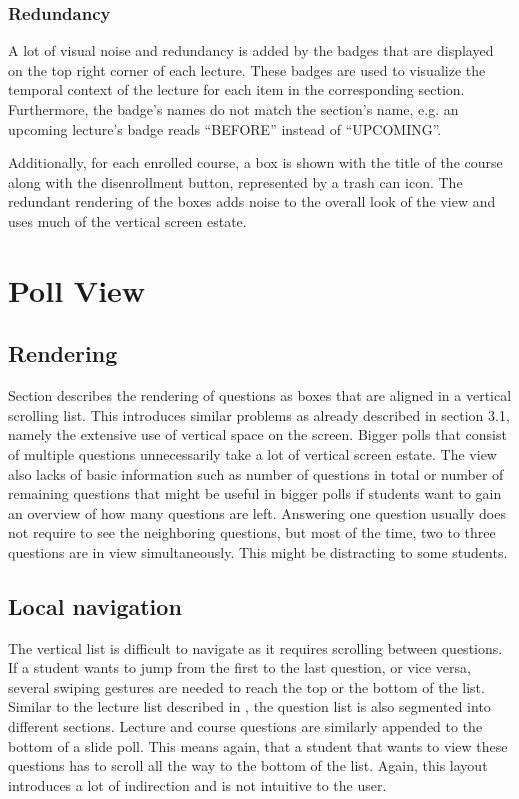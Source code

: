 \subsubsection{Redundancy}

A lot of visual noise and redundancy is added by the badges that are displayed on the top right corner of each lecture. These badges are used to visualize the temporal context of the lecture for each item in the corresponding section. Furthermore, the badge's names do not match the section's name, e.g. an upcoming lecture's badge reads “BEFORE” instead of “UPCOMING”.

Additionally, for each enrolled course, a box is shown with the title of the course along with the disenrollment button, represented by a trash can icon. The redundant rendering of the boxes adds noise to the overall look of the view and uses much of the vertical screen estate.


\section{Poll View}

\subsection{Rendering}

Section \todosct describes the rendering of questions as boxes that are aligned in a vertical scrolling list. This introduces similar problems as already described in section 3.1, namely the extensive use of vertical space on the screen. Bigger polls that consist of multiple questions unnecessarily take a lot of vertical screen estate. The view also lacks of basic information such as number of questions in total or number of remaining questions that might be useful in bigger polls if students want to gain an overview of how many questions are left.
Answering one question usually does not require to see the neighboring questions, but most of the time, two to three questions are in view simultaneously. This might be distracting to some students.

\subsection{Local navigation}

The vertical list is difficult to navigate as it requires scrolling between questions. If a student wants to jump from the first to the last question,  or vice versa, several swiping gestures are needed to reach the top or the bottom of the list.
Similar to the lecture list described in \todosct, the question list is also segmented into different sections. Lecture and course questions are similarly appended to the bottom of a slide poll. This means again, that a student that wants to view these questions has to scroll all the way to the bottom of the list. Again, this layout introduces a lot of indirection and is not intuitive to the user.


